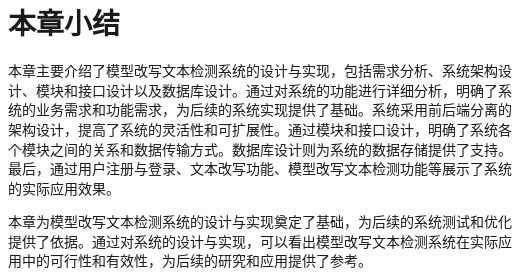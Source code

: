 \section{本章小结}
\label{sec:sys-conclusion}

本章主要介绍了模型改写文本检测系统的设计与实现，包括需求分析、系统架构设计、模块和接口设计以及数据库设计。通过对系统的功能进行详细分析，明确了系统的业务需求和功能需求，为后续的系统实现提供了基础。系统采用前后端分离的架构设计，提高了系统的灵活性和可扩展性。通过模块和接口设计，明确了系统各个模块之间的关系和数据传输方式。数据库设计则为系统的数据存储提供了支持。最后，通过用户注册与登录、文本改写功能、模型改写文本检测功能等展示了系统的实际应用效果。

本章为模型改写文本检测系统的设计与实现奠定了基础，为后续的系统测试和优化提供了依据。通过对系统的设计与实现，可以看出模型改写文本检测系统在实际应用中的可行性和有效性，为后续的研究和应用提供了参考。